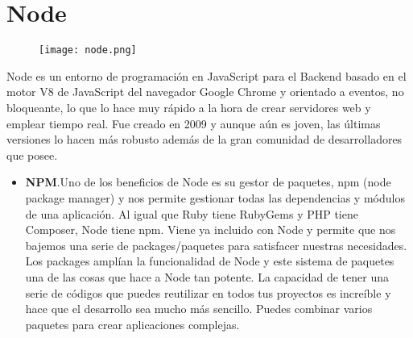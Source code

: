 \section{Node}

\begin{figure}[H]
    \centering
    \texttt{[image: node.png]}

\end{figure}
Node es un entorno de programación en JavaScript para el Backend basado en el motor V8 de JavaScript del navegador Google Chrome y orientado a eventos, no bloqueante, lo que lo hace muy rápido a la hora de crear servidores web y emplear tiempo real. Fue creado en 2009 y aunque aún es joven, las últimas versiones lo hacen más robusto además de la gran comunidad de desarrolladores que posee.

\begin{itemize}
\item \textbf{NPM}.Uno de los beneficios de Node es su gestor de paquetes, npm (node package manager) y nos permite gestionar todas las dependencias y módulos de una aplicación. Al igual que Ruby tiene RubyGems y PHP tiene Composer, Node tiene npm.
Viene ya incluido con Node y permite que nos bajemos una serie de packages/paquetes para satisfacer nuestras necesidades. Los packages amplían la funcionalidad de Node y este sistema de paquetes una de las cosas que hace a Node tan potente.
La capacidad de tener una serie de códigos que puedes reutilizar en todos tus proyectos es increíble y hace que el desarrollo sea mucho más sencillo. Puedes combinar varios paquetes para crear aplicaciones complejas.
\end{itemize}
